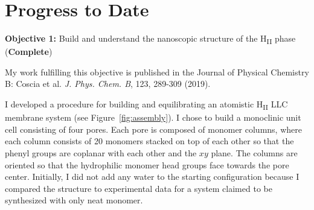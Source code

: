 \documentclass{article}
\begin{document}
  \section{Progress to Date}\label{section:progress}
  
  \textbf{\large Objective 1:} {\large Build and understand the nanoscopic structure
  of the H\textsubscript{II} phase} (\textcolor{green!40!olive}{\textbf{Complete}})
  
  \noindent My work fulfilling this objective is published in the Journal of Physical 
  Chemistry B: Coscia et al. \textit{J. Phys. Chem. B}, 123, 289-309 (2019).

  I developed a procedure for building and equilibrating an atomistic
  H\textsubscript{II} LLC membrane system (see Figure~\ref{fig:assembly}). I
  chose to build a monoclinic unit cell consisting of four pores. Each pore is
  composed of monomer columns, where each column consists of 20 monomers stacked
  on top of each other so that the phenyl groups are coplanar with each other and
  the $xy$ plane. The columns are oriented so that the hydrophilic monomer head
  groups face towards the pore center. Initially, I did not add any water to the starting 
  configuration because I compared the structure to experimental data for a
  system claimed to be synthesized with only neat monomer. 
  

\end{document}
